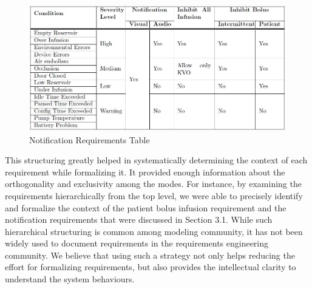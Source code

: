  \begin{figure}[h!]
    \centering
    \includegraphics[width=\columnwidth]{images/alarm.jpg}
    \caption{Notification Requirements Table}
    \label{fig:gpca-alarm}
 \end{figure}


This structuring greatly helped in systematically determining the context of each requirement while formalizing it. It provided enough information about the orthogonality and exclusivity among the modes. For instance, by examining the requirements hierarchically from the top level, we were able to precisely identify and formalize the context of the patient bolus infusion requirement and the notification requirements that were discussed in Section 3.1. While such hierarchical structuring is common among modeling community, it has not been widely used to document requirements in the requirements engineering community. We believe that using such a strategy not only helps reducing the effort for formalizing requirements, but also provides the intellectual clarity to understand the system behaviours.


